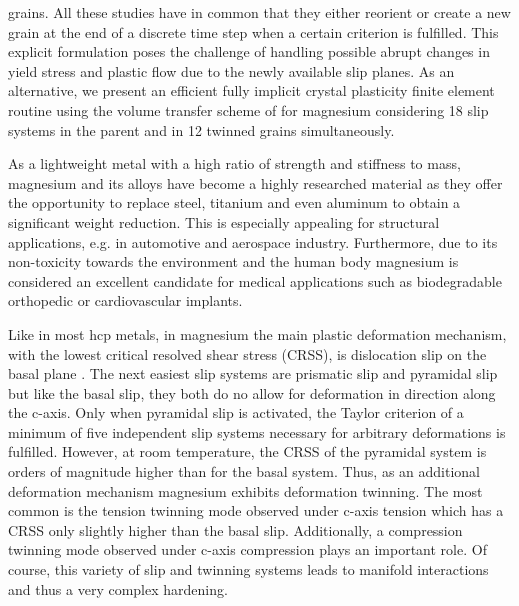grains\supercite{clausen2008reorientation,abdolvand2011incorporation,mareau2016micromechanical,feather2019mechanical}. All these studies have in common that they either reorient or create a new grain at the end of a discrete time step when a certain criterion is fulfilled. This explicit formulation poses the challenge of handling possible abrupt changes in yield stress and plastic flow due to the newly available slip planes. As an alternative, we present an efficient fully implicit crystal plasticity finite element routine using the volume transfer scheme of  for magnesium considering 18 slip systems in the parent and in 12 twinned grains simultaneously.

As a lightweight metal with a high ratio of strength and stiffness to mass, magnesium and its alloys have become a highly researched material as they offer the opportunity to replace steel, titanium and even aluminum to obtain a significant weight reduction\supercite{esmaily2017fundamentals}. This is especially appealing for structural applications, e.g. in automotive and aerospace industry\supercite{friedrich2001research,luo2013applications}. Furthermore, due to its non-toxicity towards the environment and the human body magnesium is considered an excellent candidate for medical applications such as biodegradable orthopedic or cardiovascular implants\supercite{witte2013applications,hermawan2010degradable}.

Like in most hcp metals, in magnesium the main plastic deformation mechanism, with the lowest critical resolved shear stress (CRSS), is dislocation slip on the basal plane \supercite{burke1952plastic,obara1973slip}. The next easiest slip systems are prismatic slip  and pyramidal \pyra slip \supercite{burke1952plastic,reed-hill1958pyramidal} but like the basal slip, they both do no allow for deformation in direction along the c-axis. Only when pyramidal \pyrac slip  is activated, the Taylor criterion of a minimum of five independent slip systems necessary for arbitrary deformations is fulfilled\supercite{yoo1981slip}. However, at room temperature, the CRSS of the pyramidal \pyrac system is orders of magnitude higher than for the basal system\supercite{obara1973slip}. Thus, as an additional deformation mechanism magnesium exhibits deformation twinning. The most common is the tension twinning mode  observed under c-axis tension which has a CRSS only slightly higher than the basal slip. Additionally, a compression twinning mode  observed under c-axis compression plays an important role\supercite{kelly1968plane}. Of course, this variety of slip and twinning systems leads to manifold interactions and thus a very complex hardening.

